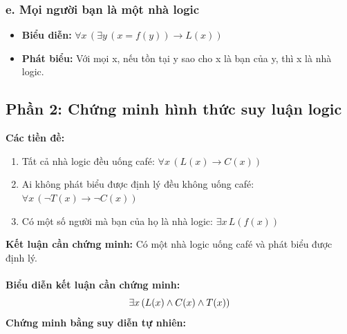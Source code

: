 \documentclass[12pt,a4paper]{article}
\begin{document}
\subsubsection{e. Mọi người bạn là một nhà logic}
\begin{itemize}
    \item \textbf{Biểu diễn:} $\forall x \, (\exists y \, (x = f(y)) \to L(x))$
    \item \textbf{Phát biểu:} Với mọi x, nếu tồn tại y sao cho x là bạn của y, thì x là nhà logic.
\end{itemize}

\subsection{Phần 2: Chứng minh hình thức suy luận logic}
\textbf{Các tiền đề:}
\begin{enumerate}
    \item[(1)] Tất cả nhà logic đều uống café: $\forall x \, (L(x) \to C(x))$
    \item[(2)] Ai không phát biểu được định lý đều không uống café: $\forall x \, (\neg T(x) \to \neg C(x))$
    \item[(3)] Có một số người mà bạn của họ là nhà logic: $\exists x \, L(f(x))$
\end{enumerate}
\textbf{Kết luận cần chứng minh:} Có một nhà logic uống café và phát biểu được định lý.\\\\
\textbf{Biểu diễn kết luận cần chứng minh:}
\begin{equation}
    \exists x \, (L(x) \land C(x) \land T(x))\\
\end{equation}
\textbf{Chứng minh bằng suy diễn tự nhiên:}
\end{document}
